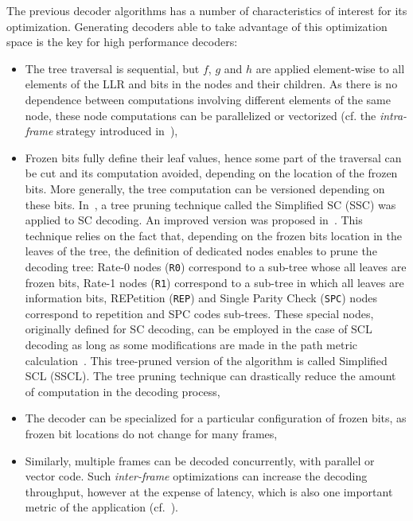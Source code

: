 The previous decoder algorithms has a number of characteristics of interest for
its optimization. Generating decoders able to take advantage of this
optimization space is the key for high performance decoders:
\begin{itemize}
  \item The tree traversal is sequential, but $f$, $g$ and $h$ are applied
    element-wise to all elements of the LLR and bits in the nodes and
    their children. As there is no dependence between computations
    involving different elements of the same node, these node computations
    can be parallelized or vectorized (cf. the \emph{intra-frame} strategy
    introduced in~\cite{Giard2014}),
  \item Frozen bits fully define their leaf values, hence some part of the
    traversal can be cut and its computation avoided, depending on the
    location of the frozen bits. More generally, the tree computation can
    be versioned depending on these bits. In~\cite{Alamdar-Yazdi2011}, a tree
    pruning technique called the Simplified SC (SSC) was applied to SC decoding.
    An improved version was proposed in~\cite{Sarkis2014a}. This technique
    relies on the fact that, depending on the frozen bits location in the leaves
    of the tree, the definition of dedicated nodes enables to prune the decoding
    tree: Rate-0 nodes (\verb|R0|) correspond to a sub-tree whose all leaves
    are frozen bits, Rate-1 nodes (\verb|R1|) correspond to a sub-tree in
    which all leaves are information bits, REPetition (\verb|REP|) and Single
    Parity Check (\verb|SPC|) nodes correspond to repetition and SPC codes
    sub-trees. These special nodes, originally defined for SC decoding, can be
    employed in the case of SCL decoding as long as some modifications are made
    in the path metric calculation~\cite{Sarkis2016}. This tree-pruned version
    of the algorithm is called Simplified SCL (SSCL). The tree pruning technique
    can drastically reduce the amount of computation in the decoding process,
  \item The decoder can be specialized for a particular configuration of frozen
    bits, as frozen bit locations do not change for many frames,
  \item Similarly, multiple frames can be decoded concurrently, with parallel or
    vector code. Such \emph{inter-frame} optimizations can increase the decoding
    throughput, however at the expense of latency, which is also one important
    metric of the application (cf.~\cite{LeGal2015a}).
\end{itemize}

